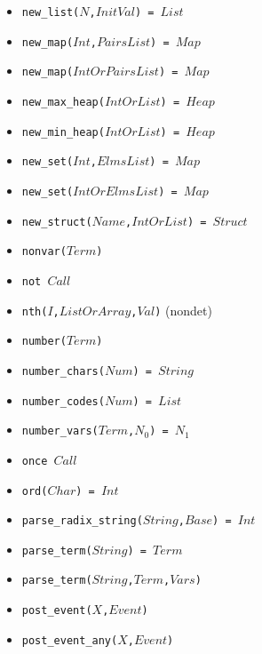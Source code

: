 \documentclass[10pt]{article}
\begin{document}
\begin{multicols}{2}
\begin{scriptsize}
\begin{itemize}
    \item \texttt{new\_list($N$,$InitVal$) = $List$} 
    \item \texttt{new\_map($Int$,$PairsList$) = $Map$} 
    \item \texttt{new\_map($IntOrPairsList$) = $Map$} 
    \item \texttt{new\_max\_heap($IntOrList$) = $Heap$}
    \item \texttt{new\_min\_heap($IntOrList$) = $Heap$}
    \item \texttt{new\_set($Int$,$ElmsList$) = $Map$} 
    \item \texttt{new\_set($IntOrElmsList$) = $Map$} 
    \item \texttt{new\_struct($Name$,$IntOrList$) = $Struct$} 
    \item \texttt{nonvar($Term$)} 
    \item \texttt{not $Call$}
    \item \texttt{nth($I$,$ListOrArray$,$Val$)} (nondet)
    \item \texttt{number($Term$)} 
    \item \texttt{number\_chars($Num$) = $String$} 
    \item \texttt{number\_codes($Num$) = $List$} 
    \item \texttt{number\_vars($Term$,$N_0$) = $N_1$}
    \item \texttt{once $Call$}
    \item \texttt{ord($Char$) = $Int$} 
    \item \texttt{parse\_radix\_string($String$,$Base$) = $Int$}
    \item \texttt{parse\_term($String$) = $Term$}
    \item \texttt{parse\_term($String$,$Term$,$Vars$)}
    \item \texttt{post\_event($X$,$Event$)}
    \item \texttt{post\_event\_any($X$,$Event$)}

\end{itemize}
\end{scriptsize}
\end{multicols}
\end{document}
